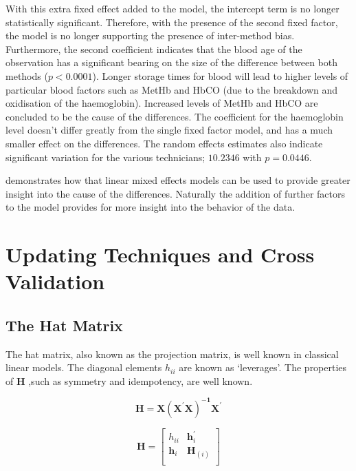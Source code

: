 \documentclass[12pt, a4paper]{report}
\theoremstyle{plain}
\theoremstyle{definition}
\theoremstyle{remark}
\begin{document}
	
	With this extra fixed effect added to the model, the intercept
	term is no longer statistically significant. Therefore, with the
	presence of the second fixed factor, the model is no longer
	supporting the presence of inter-method bias. Furthermore, the
	second coefficient indicates that the blood age of the observation
	has a significant bearing on the size of the difference between
	both methods ($p <0.0001$). Longer storage times for blood will
	lead to higher levels of particular blood factors such as MetHb
	and HbCO (due to the breakdown and oxidisation of the
	haemoglobin). Increased levels of MetHb and HbCO are concluded to
	be the cause of the differences. The coefficient for the
	haemoglobin level doesn't differ greatly from the single fixed
	factor model, and has a much smaller effect on the differences.
	The random effects estimates also indicate significant variation
	for the various technicians; $10.2346$ with $p=0.0446$.
	
	\citet{LaiShiao} demonstrates how that linear mixed effects models
	can be used to provide greater insight into the cause of the
	differences. Naturally the addition of further factors to the
	model provides for more insight into the behavior of the data.
	
	\chapter{Updating Techniques and Cross Validation}
	
	\section{The Hat Matrix}
	The hat matrix, also known as the projection matrix, is well known in classical linear models. The diagonal elements $h_{ii}$ are known as `leverages'. The properties of $\boldsymbol{H}$  ,such as symmetry and idempotency, are well known.
	
	
	\begin{equation*}
	\boldsymbol{H} =  \boldsymbol{X(X^{\prime}X)^{-1}X^{\prime}}
	\end{equation*}
	
	
	\begin{equation*}
	\boldsymbol{H} = \left[%
	\begin{array}{cc}
	h_{ii} & \boldsymbol{h}^{\prime}_{i}\\
	\boldsymbol{h}_{i} & \boldsymbol{H}_{(i)}\\
	\end{array}%
	\right]
	\end{equation*}
	
\end{document}
